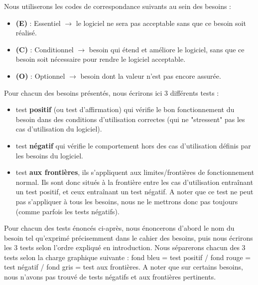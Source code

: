 \documentclass [ 11 pt ] {article}
\begin{document}
 Nous utiliserons les codes de correspondance suivants au sein des besoins :
    \begin{itemize}
        \item \textbf{(E)} : Essentiel $\rightarrow$ le logiciel ne sera pas acceptable sans que ce besoin soit réalisé.
        \item \textbf{(C)} : Conditionnel $\rightarrow$ besoin qui étend et améliore le logiciel, sans que ce besoin soit nécessaire pour rendre le logiciel acceptable.
        \item \textbf{(O)} : Optionnel $\rightarrow$ besoin dont la valeur n'est pas encore assurée.
    \end{itemize}
Pour chacun des besoins présentés, nous écrirons ici 3 différents tests : 
    \begin{itemize}
        \item test \textbf{positif} (ou test d'affirmation) qui vérifie le bon fonctionnement du besoin dans des conditions d'utilisation correctes (qui ne "stressent" pas les cas d'utilisation du logiciel). 
        
        \item test \textbf{négatif} qui vérifie le comportement hors des cas d'utilisation définis par les besoins du logiciel.
        
        \item test \textbf{aux frontières}, ils s'appliquent aux limites/frontières de fonctionnement normal. Ils sont donc situés à la frontière entre les cas d'utilisation entraînant un test positif, et ceux entraînant un test négatif. A noter que ce test ne peut pas s'appliquer à tous les besoins, nous ne le mettrons donc pas toujours (comme parfois les tests négatifs).
    \end{itemize}      
Pour chacun des tests énoncés ci-après, nous énoncerons d'abord le nom du besoin tel qu'exprimé précisemment dans le cahier des besoins, puis nous écrirons les 3 tests selon l'ordre expliqué en introduction. Nous séparerons chacun des 3 tests selon la charge graphique suivante : fond bleu = test positif / fond rouge = test négatif / fond gris = test aux frontières. A noter que sur certains besoins, nous n'avons pas trouvé de tests négatifs et aux frontières pertinents. \newline
\end{document}
